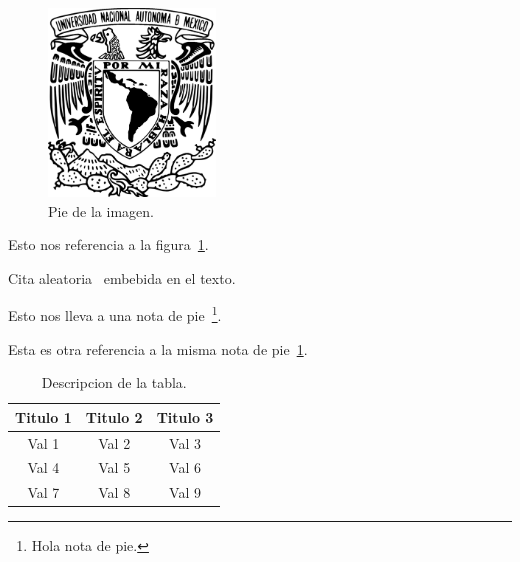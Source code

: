\documentclass[a4paper,11pt]{article}                 %
\begin{document}
  \begin{figure}[H]
    \centering                                        %
    \includegraphics[height=5cm]{images/escudo-unam}  %
    \caption{Pie de la imagen.}                       %
    \label{fig:fig1}                                  %
  \end{figure}

  Esto nos referencia a la figura~\ref{fig:fig1}.    %
  
  Cita aleatoria~\cite{ref:cita} embebida en el texto.  %
  
  Esto nos lleva a una nota de pie~\footnote{\label{notaDePie}Hola nota de pie.}. %
  
  Esta es otra referencia a la misma nota de pie~\ref{notaDePie}. %
  
  \begin{table}[H]
    \centering                                        %
    \begin{tabular}{ccc}                              %
      \toprule                                        %
      Titulo 1 & Titulo 2 & Titulo 3\\
      \midrule                                        %
      Val 1 & Val 2 & Val 3\\             %
      Val 4 & Val 5 & Val 6\\
      Val 7 & Val 8 & Val 9\\
      \bottomrule                                     %
    \end{tabular}
    \caption{Descripcion de la tabla.}                %
    \label{tab:tab1}                                  %
  \end{table}
  
\end{document}
